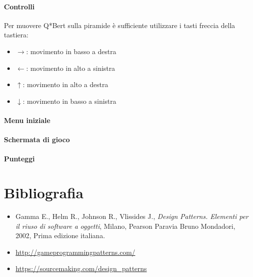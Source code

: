 \documentclass[a4paper,12pt, hidelinks]{report}
\begin{document}
\subsubsection{Controlli}

Per muovere Q*Bert sulla piramide è sufficiente utilizzare i tasti freccia della tastiera:

\begin{itemize}
	\item \textbf{$\rightarrow$}: movimento in basso a destra
	\item \textbf{$\leftarrow$}: movimento in alto a sinistra
	\item \textbf{$\uparrow$}: movimento in alto a destra
	\item \textbf{$\downarrow$}: movimento in basso a sinistra
\end{itemize}

\subsubsection{Menu iniziale}

\subsubsection{Schermata di gioco}

\subsubsection{Punteggi}

\chapter{Bibliografia}

\begin{itemize}
	\item Gamma E., Helm R., Johnson R., Vlissides J., \emph{Design Patterns. Elementi per il riuso di software a oggetti}, Milano, Pearson Paravia Bruno Mondadori, 2002, Prima edizione italiana.
	\item \href{http://gameprogrammingpatterns.com/}{http://gameprogrammingpatterns.com/}
	\item \href{https://sourcemaking.com/design\_patterns}{https://sourcemaking.com/design\_patterns}

\end{itemize}




%
%
\end{document}
